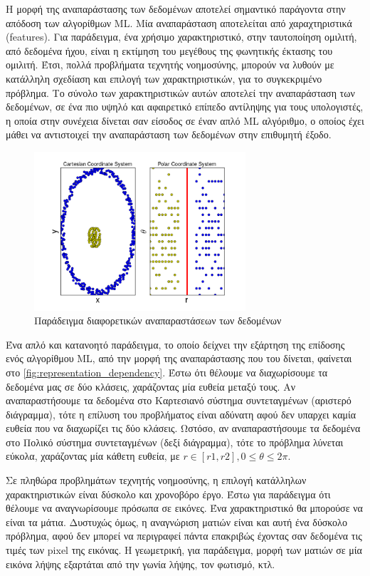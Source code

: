 Η μορφή της αναπαράστασης των δεδομένων αποτελεί σημαντικό παράγοντα στην
απόδοση των αλγορίθμων ML. Μία αναπαράσταση αποτελείται από χαραχτηριστικά (features).
Για παράδειγμα, ένα χρήσιμο χαρακτηριστικό, στην ταυτοποίηση ομιλιτή, από δεδομένα ήχου,
είναι η εκτίμηση του μεγέθους της φωνητικής έκτασης του ομιλιτή.
Έτσι, πολλά προβλήματα τεχνητής νοημοσύνης, μπορούν να λυθούν
με κατάλληλη σχεδίαση και επιλογή των χαρακτηριστικών, για το συγκεκριμένο
πρόβλημα. Το σύνολο των χαρακτηριστικών αυτών αποτελεί την αναπαράσταση των δεδομένων,
σε ένα πιο υψηλό και αφαιρετικό επίπεδο αντίληψης για τους υπολογιστές, η οποία
στην συνέχεια δίνεται σαν είσοδος σε έναν απλό ML αλγόριθμο, ο οποίος έχει
μάθει να αντιστοιχεί την αναπαράσταση των δεδομένων στην επιθυμητή έξοδο.
\begin{figure}[!h]
  \centering
  \includegraphics[width=0.7\textwidth]{./images/chapter3/representation_dependency.png}
  \caption[Παράδειγμα διαφορετικών αναπαραστάσεων των δεδομένων]{Παράδειγμα διαφορετικών αναπαραστάσεων των δεδομένων}
  \label{fig:representation_dependency}
\end{figure}

Ένα απλό και κατανοητό παράδειγμα, το οποίο δείχνει την εξάρτηση της επίδοσης ενός
αλγορίθμου ML, από την μορφή της αναπαράστασης που του δίνεται, φαίνεται στο
\autoref{fig:representation_dependency}. Έστω ότι θέλουμε να
διαχωρίσουμε τα δεδομένα μας σε δύο κλάσεις, χαράζοντας μία ευθεία
μεταξύ τους. Αν αναπαραστήσουμε τα δεδομένα στο Καρτεσιανό σύστημα συντεταγμένων (αριστερό διάγραμμα),
τότε η επίλυση του προβλήματος είναι αδύνατη αφού δεν υπαρχει καμία ευθεία
που να διαχωρίζει τις δύο κλάσεις. Ωστόσο, αν αναπαραστήσουμε τα δεδομένα
στο Πολικό σύστημα συντεταγμένων (δεξί διάγραμμα), τότε το πρόβλημα λύνεται
εύκολα, χαράζοντας μία κάθετη ευθεία, με $r \in [r1, r2], 0 \leq \theta \leq 2\pi$.

Σε πληθώρα προβλημάτων τεχνητής νοημοσύνης, η επιλογή κατάλληλων χαρακτηριστικών
είναι δύσκολο και χρονοβόρο έργο. Έστω για παράδειγμα ότι θέλουμε να αναγνωρίσουμε
πρόσωπα σε εικόνες. Ένα χαρακτηριστικό θα μπορούσε να είναι τα μάτια. Δυστυχώς όμως,
η αναγνώριση ματιών είναι και αυτή ένα δύσκολο πρόβλημα, αφού δεν μπορεί να
περιγραφεί πάντα επακριβώς έχοντας σαν δεδομένα τις τιμές των pixel της εικόνας.
Η γεωμετρική, για παράδειγμα, μορφή των ματιών σε μία εικόνα λήψης εξαρτάται από την
γωνία λήψης, τον φωτισμό, κτλ.


%



